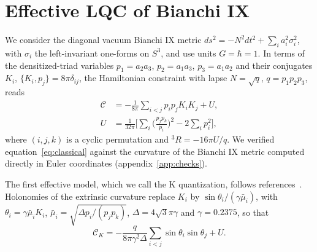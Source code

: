 \documentclass[12pt]{iopjournal}
\begin{document}
\section{Effective LQC of Bianchi IX}\label{sec:model}

We consider the diagonal vacuum Bianchi IX metric $ds^2=-N^2dt^2+\sum_ia_i^2\sigma_i^2$, with $\sigma_i$ the
left-invariant one-forms on $S^3$, and use units $G=\hbar=1$. In terms of the densitized-triad variables
$p_1=a_2a_3$, $p_2=a_1a_3$, $p_3=a_1a_2$ and their conjugates $K_i$, $\{K_i,p_j\}=8\pi\delta_{ij}$, the
Hamiltonian constraint with lapse $N=\sqrt q$, $q=p_1p_2p_3$, reads
\begin{align}
  \mathcal C&=-\frac{1}{8\pi}\sum_{i<j}p_ip_jK_iK_j+U,\label{eq:classical}\\
  U&=\frac{1}{32\pi}\Big[\sum_i\Big(\frac{p_jp_k}{p_i}\Big)^2-2\sum_ip_i^2\Big],\nonumber
\end{align}
where $(i,j,k)$ is a cyclic permutation and ${}^3\!R=-16\pi U/q$. We verified equation~\eqref{eq:classical} against the curvature of the Bianchi IX metric computed directly in Euler coordinates (appendix~\ref{app:checks}).

The first effective model, which we call the K quantization, follows
references~\cite{SinghWilsonEwing2014,BlackmoreWilsonEwing2023}. Holonomies of the extrinsic curvature
replace $K_i$ by $\sin\theta_i/(\gamma\bar\mu_i)$, with $\theta_i=\gamma\bar\mu_iK_i$,
$\bar\mu_i=\sqrt{\Delta p_i/(p_jp_k)}$, $\Delta=4\sqrt3\pi\gamma$ and $\gamma=0.2375$, so that
\begin{equation}
  \mathcal C_K=-\frac{q}{8\pi\gamma^2\Delta}\sum_{i<j}\sin\theta_i\sin\theta_j+U .
  \label{eq:K}
\end{equation}
\end{document}
